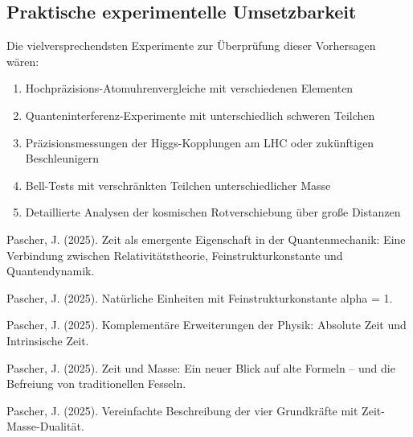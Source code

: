 \documentclass[a4paper,12pt]{article}
\begin{document}
		\subsection{Praktische experimentelle Umsetzbarkeit}
		
		Die vielversprechendsten Experimente zur Überprüfung dieser Vorhersagen wären:
		\begin{enumerate}
		\item Hochpräzisions-Atomuhrenvergleiche mit verschiedenen Elementen
		\item Quanteninterferenz-Experimente mit unterschiedlich schweren Teilchen
		\item Präzisionsmessungen der Higgs-Kopplungen am LHC oder zukünftigen Beschleunigern
		\item Bell-Tests mit verschränkten Teilchen unterschiedlicher Masse
		\item Detaillierte Analysen der kosmischen Rotverschiebung über große Distanzen
		\end{enumerate}
		
		\begin{thebibliography}{9}
		
		 Pascher, J. (2025). Zeit als emergente Eigenschaft in der Quantenmechanik: Eine Verbindung zwischen Relativitätstheorie, Feinstrukturkonstante und Quantendynamik.
		
		 Pascher, J. (2025). Natürliche Einheiten mit Feinstrukturkonstante alpha = 1.
		
		 Pascher, J. (2025). Komplementäre Erweiterungen der Physik: Absolute Zeit und Intrinsische Zeit.
		
		 Pascher, J. (2025). Zeit und Masse: Ein neuer Blick auf alte Formeln – und die Befreiung von traditionellen Fesseln.
		
		 Pascher, J. (2025). Vereinfachte Beschreibung der vier Grundkräfte mit Zeit-Masse-Dualität.
		
		\end{thebibliography}
		
	
\end{document}

